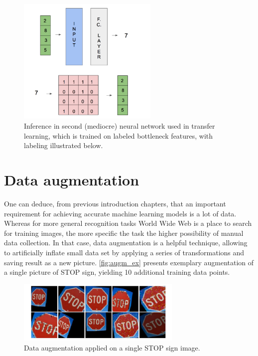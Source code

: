\documentclass[11pt, a4paper]{article}
\begin{document}
\begin{figure}[h]
\includegraphics[width=0.6\textwidth]{using_bottleneck}
\centering
\caption[Wnioskowanie drugiej sieci poprzez wykorzystanie tzw. bottleneck features]{Inference in second (mediocre) neural network used in transfer learning, which is trained on labeled bottleneck features, with labeling illustrated below.}
\label{fig:using_bottleneck}
\end{figure}
\clearpage

\section{Data augmentation} \label{data_augmentation}
One can deduce, from previous introduction chapters, that an important requirement for achieving accurate machine learning models is a lot of data. Whereas for more general recognition tasks World Wide Web is a place to search for training images, the more specific the task the higher possibility of manual data collection. In that case, data augmentation is a helpful technique, allowing to artificially inflate small data set by applying a series of transformations and saving result as a new picture. \autoref{fig:augm_ex} presents exemplary augmentation of a single picture of STOP sign, yielding 10 additional training data points.

\begin{figure}[h]
\includegraphics[width=0.7\textwidth]{augm_ex}
\centering
\caption[Augmentacja danych na znaku STOP]{Data augmentation applied on a single STOP sign image.}
\label{fig:augm_ex}
\end{figure}
\end{document}
